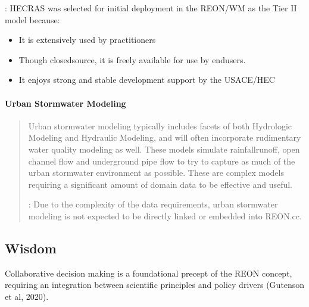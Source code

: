 \documentclass[letterpaper,12pt,english]{book}
\begin{document}
\sphinxAtStartPar
{}: HEC\sphinxhyphen{}RAS was selected for initial deployment in the REON/WM as the Tier II model because:
\begin{itemize}
\item {} 
\sphinxAtStartPar
It is extensively used by practitioners

\item {} 
\sphinxAtStartPar
Though closed\sphinxhyphen{}source, it is freely available for use by end\sphinxhyphen{}users.

\item {} 
\sphinxAtStartPar
It enjoys strong and stable development support by the USACE/HEC

\end{itemize}

\paragraph{Urban Stormwater Modeling}
\label{\detokenize{requirements/knowledge/stormwater:urban-stormwater-modeling}}\label{\detokenize{requirements/knowledge/stormwater::doc}}\begin{quote}

\sphinxAtStartPar
Urban stormwater modeling typically includes facets of both Hydrologic Modeling and Hydraulic Modeling, and will often incorporate rudimentary water quality modeling as well. These models simulate rainfall\sphinxhyphen{}runoff, open channel flow and underground pipe flow to try to capture as much of the urban stormwater environment as possible. These are complex models requiring a significant amount of domain data to be effective and useful.

\sphinxAtStartPar
{}: Due to the complexity of the data requirements, urban stormwater modeling is not expected to be directly linked or embedded into REON.cc.
\end{quote}


\subsection{Wisdom}
\label{\detokenize{requirements/wisdom/index:wisdom}}\label{\detokenize{requirements/wisdom/index::doc}}
\sphinxAtStartPar
Collaborative decision making is a foundational precept of the REON concept,
requiring an integration between scientific principles and policy drivers
(Gutenson et al, 2020).
\end{document}
